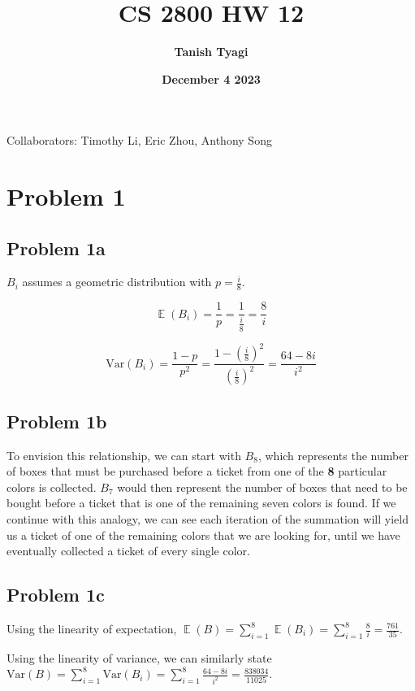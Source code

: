 \documentclass{article}
\title{\textbf{CS 2800 HW 12}}
\author{\textbf{Tanish Tyagi}}
\date{\textbf{December 4 2023}}
\newcommand{\Var}{\mathrm{Var}}
\DeclareMathOperator{\EX}{\mathbb{E}}
\begin{document}
\maketitle

\begin{center}
Collaborators: Timothy Li, Eric Zhou, Anthony Song
\end{center}

\section{Problem 1}

\subsection{Problem 1a}

$B_i$ assumes a geometric distribution with $p = \frac{i}{8}$.

$$
\EX(B_i) = \frac{1}{p} = \frac{1}{\frac{i}{8}} = \frac{8}{i}
$$

$$
\Var(B_i) = \frac{1 - p}{p^2} = \frac{1 - (\frac{i}{8})^2}{(\frac{i}{8})^2} = \frac{64 - 8i}{i^2}
$$

\subsection{Problem 1b}

To envision this relationship, we can start with $B_8$, which represents the number of boxes that must be purchased before a ticket from one of the \textbf{8} particular colors is collected. 
$B_7$ would then represent the number of boxes that need to be bought before a ticket that is one of the remaining seven colors is found. If we continue with this analogy, we can see each iteration of the summation will yield us a ticket of one of the remaining colors that we are looking for, until we have eventually collected a ticket of every single color.

\subsection{Problem 1c}

Using the linearity of expectation, $\EX(B) = \sum_{i = 1}^{8} \EX(B_i) = \sum_{i = 1}^{8} \frac{8}{i} = \boxed{\frac{761}{35}}$.

\noindent Using the linearity of variance, we can similarly state $\Var(B) = \sum_{i = 1}^{8}\Var(B_i) = \sum_{i = 1}^{8}\frac{64 - 8i}{i^2} = \boxed{\frac{838034}{11025}}$.
\end{document}
